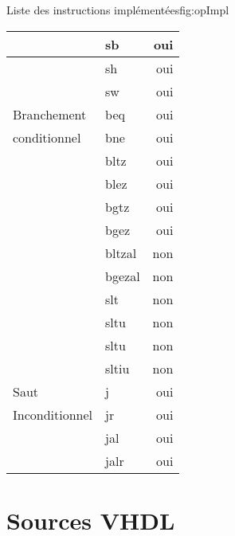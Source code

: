 \begin{figureGraphics}{Liste des instructions implémentées}{fig:opImpl}
\begin{tabular}{|l|l|r|}
          \hline
                         &  sb  &  oui\\
          \hline
                         &  sh  &  oui\\
          \hline
                         &  sw  &  oui\\
          \hline
          \hline
            Branchement  &  beq  &  oui\\
          \hline
           conditionnel  &  bne  &  oui\\
          \hline
                         &  bltz  &  oui\\
          \hline
                         &  blez  &  oui\\
          \hline
                         &  bgtz  &  oui\\
          \hline
                         &  bgez  &  oui\\
          \hline
                         &  bltzal  &  non\\
          \hline
                         &  bgezal  &  non\\
          \hline
                         &  slt  &  non\\
          \hline
                         &  sltu  &  non\\
          \hline
                         &  sltu  &  non\\
          \hline
                         &  sltiu  &  non\\
          \hline
          \hline
                   Saut  &  j  &  oui\\
          \hline
         Inconditionnel  &  jr  &  oui\\
          \hline
                         &  jal  &  oui\\
          \hline
                         &  jalr  &  oui\\
          \hline
        \end{tabular}
      \end{figureGraphics}

\section{Sources VHDL}








